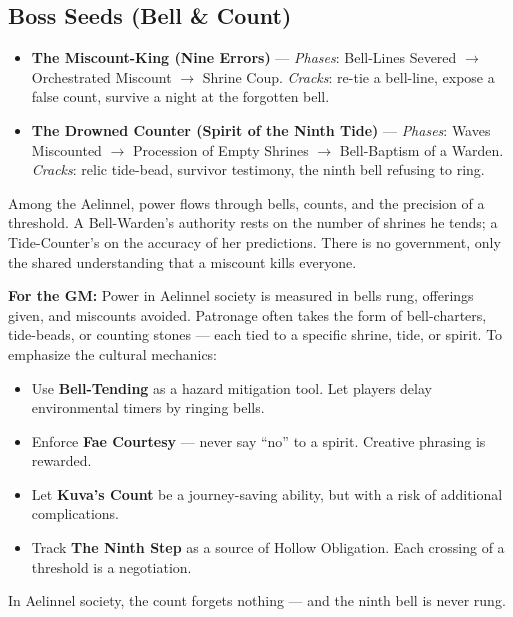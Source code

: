 \subsection*{Boss Seeds (Bell \& Count)}
\begin{itemize}
\item \textbf{The Miscount-King (Nine Errors)} --- \emph{Phases}: Bell-Lines Severed $\rightarrow$ Orchestrated Miscount $\rightarrow$ Shrine Coup. \emph{Cracks}: re-tie a bell-line, expose a false count, survive a night at the forgotten bell.
\item \textbf{The Drowned Counter (Spirit of the Ninth Tide)} --- \emph{Phases}: Waves Miscounted $\rightarrow$ Procession of Empty Shrines $\rightarrow$ Bell-Baptism of a Warden. \emph{Cracks}: relic tide-bead, survivor testimony, the ninth bell refusing to ring.
\end{itemize}

\begin{tcolorbox}[colback=black!3,colframe=black!40!white,title={Patronage \& Power},breakable]
Among the Aelinnel, power flows through bells, counts, and the precision of a threshold. A Bell-Warden's authority rests on the number of shrines he tends; a Tide-Counter's on the accuracy of her predictions. There is no government, only the shared understanding that a miscount kills everyone.

\textbf{For the GM:}  
Power in Aelinnel society is measured in bells rung, offerings given, and miscounts avoided. Patronage often takes the form of bell-charters, tide-beads, or counting stones --- each tied to a specific shrine, tide, or spirit. To emphasize the cultural mechanics:
\begin{itemize}
\item Use \textbf{Bell-Tending} as a hazard mitigation tool. Let players delay environmental timers by ringing bells.
\item Enforce \textbf{Fae Courtesy} --- never say ``no'' to a spirit. Creative phrasing is rewarded.
\item Let \textbf{Kuva's Count} be a journey-saving ability, but with a risk of additional complications.
\item Track \textbf{The Ninth Step} as a source of Hollow Obligation. Each crossing of a threshold is a negotiation.
\end{itemize}
In Aelinnel society, the count forgets nothing --- and the ninth bell is never rung.
\end{tcolorbox}

